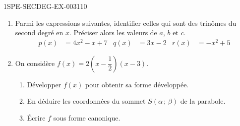 \begin{exercice}{1SPE-SECDEG-EX-003}{1}{10}
\begin{enumerate}
  \item Parmi les expressions suivantes, identifier celles qui sont des trinômes du second degré en $x$. Préciser alors les valeurs de $a$, $b$ et $c$.
  \begin{align*}
    p(x) &= 4x^2 - x + 7 & q(x) &= 3x - 2 & r(x) &= -x^2 + 5
  \end{align*}

  \item On considère $f(x) = 2\!\left(x - \dfrac{1}{2}\right)\!(x - 3)$.
  \begin{enumerate}
    \item Développer $f(x)$ pour obtenir sa forme développée.
    \item En déduire les coordonnées du sommet $S(\alpha\,;\,\beta)$ de la parabole.
    \item Écrire $f$ sous forme canonique.
  \end{enumerate}
\end{enumerate}
\end{exercice}
